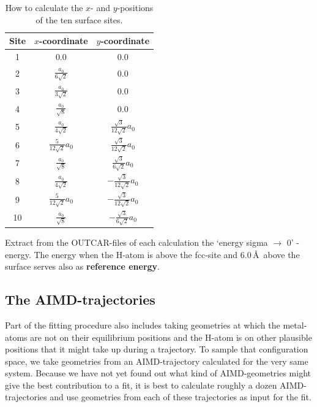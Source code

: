 \documentclass[twoside, 11pt, titlepage, captions=nooneline, a4paper, headsepline]{scrbook}%
\newcommand{\9}{\mathrm}
\newcommand{\0}{\,\mathrm}
\begin{document}
\begin{table}[h!]
\centering
\caption{How to calculate the $x$- and $y$-positions of the ten surface sites.}
\label{calsusi}
\begin{tabular}{ccc}
\hline\hline
Site&$x$-coordinate&$y$-coordinate\\
\hline
1&0.0						&0.0\\
2& $\frac{a_0}{6\sqrt{2}}$	&0.0\\
3& $\frac{a_0}{3\sqrt{2}}$	&0.0\\
4& $\frac{a_0}{\sqrt{8}}$	&0.0\\
5& $\frac{a_0}{4 \sqrt{2}}$	&$\frac{\sqrt{3}}{12\sqrt{2}}a_0$\\
6& $\frac{5}{12\sqrt{2}}a_0$&$\frac{\sqrt{3}}{12\sqrt{2}}a_0$\\
7& $\frac{a_0}{\sqrt{8}}$	&$\frac{\sqrt{3}}{6\sqrt{2}}a_0$\\
8& $\frac{a_0}{4\sqrt{2}}$	&$-\frac{\sqrt{3}}{12\sqrt{2}}a_0$\\
9& $\frac{5}{12\sqrt{2}}a_0$&$-\frac{\sqrt{3}}{12\sqrt{2}}a_0$\\
10&$\frac{a_0}{\sqrt{8}}$ 	&$-\frac{\sqrt{3}}{6\sqrt{2}}a_0$\\
\hline\hline
\end{tabular}
\end{table}\newline\noindent
Extract from the OUTCAR-files of each calculation the `energy sigma $\rightarrow$ 0' -energy. The energy when the H-atom is above the fcc-site and 6.0\,\AA~above the surface serves also as \textbf{reference energy}.
\subsection{The AIMD-trajectories}
Part of the fitting procedure also includes taking geometries at which the metal-atoms are not on their equilibrium positions and the H-atom is on other plausible positions that it might take up during a trajectory. To sample that configuration space, we take geometries from an AIMD-trajectory calculated for the very same system. Because we have not yet found out what kind of AIMD-geometries might give the best contribution to a fit, it is best to calculate roughly a dozen AIMD-trajectories and use geometries from each of these trajectories as input for the fit.
\end{document}
